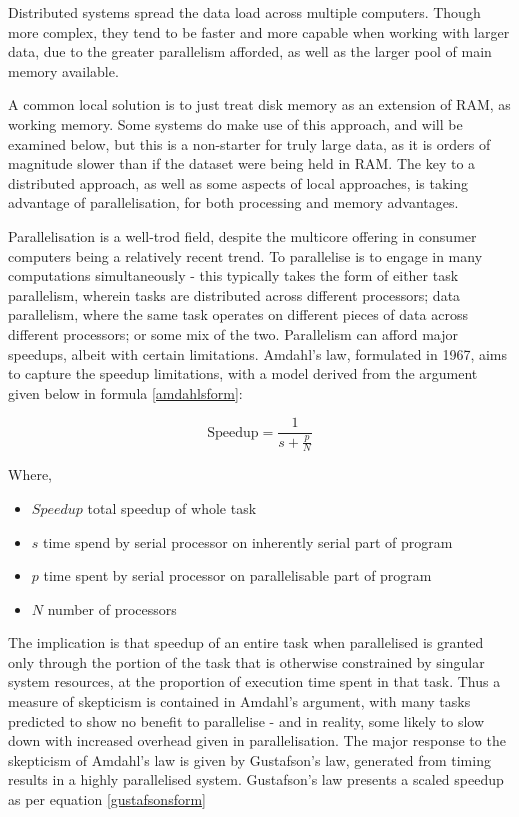 Distributed systems spread the data load across multiple computers.
Though more complex, they tend to be faster and more capable when working with larger data, due to the greater parallelism afforded, as well as the larger pool of main memory available.

A common local solution is to just treat disk memory as an extension of RAM, as working memory.
Some systems do make use of this approach, and will be examined below, but this is a non-starter for truly large data, as it is orders of magnitude slower than if the dataset were being held in RAM.
The key to a distributed approach, as well as some aspects of local approaches, is taking advantage of parallelisation, for both processing and memory advantages.

Parallelisation is a well-trod field, despite the multicore offering in consumer computers being a relatively recent trend.
To parallelise is to engage in many computations simultaneously - this typically takes the form of either task parallelism, wherein tasks are distributed across different processors; data parallelism, where the same task operates on different pieces of data across different processors; or some mix of the two.
Parallelism can afford major speedups, albeit with certain limitations.
Amdahl's law, formulated in 1967, aims to capture the speedup limitations, with a model derived from the argument given below in formula \ref{amdahlsform}\cite{amdahl1967law}\cite{gustafson1988law}:

\begin{equation}
        \label{amdahlsform}
        \textrm{Speedup} = \frac{1}{s+\frac{p}{N}}
\end{equation}

Where,

\begin{itemize}
        \item \(Speedup\) total speedup of whole task
        \item \(s\) time spend by serial processor on inherently serial part of program
        \item \(p\) time spent by serial processor on parallelisable part of program
        \item \(N\) number of processors
\end{itemize}

The implication is that speedup of an entire task when parallelised is granted only through the portion of the task that is otherwise constrained by singular system resources, at the proportion of execution time spent in that task.
Thus a measure of skepticism is contained in Amdahl's argument, with many tasks predicted to show no benefit to parallelise - and in reality, some likely to slow down with increased overhead given in parallelisation.
The major response to the skepticism of Amdahl's law is given by Gustafson's law, generated from timing results in a highly parallelised system.
Gustafson's law presents a scaled speedup as per equation \ref{gustafsonsform}

